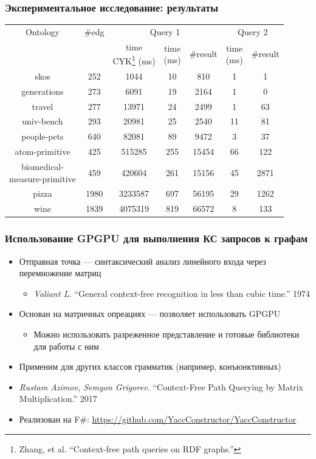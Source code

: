 \documentclass[xcolor=table]{beamer}
\begin{document}
\begin{frame}[fragile]
\transwipe[direction=90]
\frametitle{Экспериментальное исследование: результаты}
\centering
{}
\begin{tabular}{  c | c | c | c | c | c | c }
Ontology & \#edg & \multicolumn{3}{c|}{Query 1} & \multicolumn{2}{c}{Query 2} \\
\cline{3-7}
& & \shortstack{time \\ CYK\footnote{Zhang, et al. ``Context-free path queries on RDF graphs.''} (ms)} & \shortstack{time \\ (ms)} & \#result & \shortstack{time \\ (ms)} & \#result \\
\hline 
\hline
skos        & 252  & 1044  & 10 & 810 & 1 & 1 \\
generations & 273  & 6091  & 19 & 2164 & 1 & 0 \\
travel      & 277  & 13971 & 24 & 2499 & 1 & 63 \\
univ-bench  & 293  & 20981 & 25 & 2540 & 11 & 81 \\
people-pets & 640  & 82081 & 89 & 9472 & 3 & 37 \\
atom-primitive & 425 & 515285 & 255 & 15454 & 66 & 122 \\
\shortstack{biomedical- \\ measure-primitive} & 459 & 420604 & 261 & 15156 & 45 & 2871 \\
pizza       & 1980 & 3233587 & 697 & 56195 & 29 & 1262 \\
wine        & 1839 & 4075319 & 819 & 66572 & 8 & 133 \\
\end{tabular}

\end{frame}

\begin{frame}[fragile]
  \transwipe[direction=90]
  \frametitle{Использование GPGPU для выполнения КС запросов к графам}

\begin{itemize} 
\item Отправная точка --- синтаксический анализ линейного входа через перемножение матриц
\begin{itemize}     
  \item \emph{Valiant L.} ``General context-free recognition in less than cubic time.'' 1974
\end{itemize}
\item Основан на матричных опреациях --- позволяет использовать GPGPU
\begin{itemize}     
  \item Можно использовать разреженное представление и готовые библиотеки для работы с ним
\end{itemize}
\item Применим для других классов грамматик (например, конъюнктивных)
\item \emph{Rustam Azimov, Semyon Grigorev.} ``Context-Free Path Querying by Matrix Multiplication.'' 2017
\item Реализован на F\#: \url{https://github.com/YaccConstructor/YaccConstructor}
\end{itemize}
\end{frame}
\end{document}
